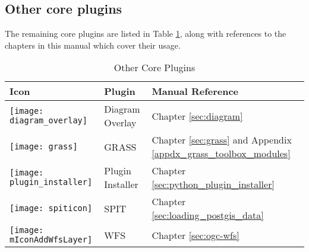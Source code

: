 
\subsection{Other core plugins}


The remaining core plugins are listed in Table \ref{tab:other_core}, along with references to 
the chapters in this manual which cover their usage.

\begin{table}[H]
\centering
\caption{Other Core Plugins}\label{tab:other_core}\medskip
\small
 \begin{tabular}{|l|l|p{4in}|}
\hline \textbf{Icon} & \textbf{Plugin} & \textbf{Manual Reference}\\
\hline
\texttt{[image: diagram\_overlay]}
 & Diagram Overlay \index{plugins!diagram}& Chapter \ref{sec:diagram}\\
\hline
\texttt{[image: grass]}
 & GRASS \index{plugin!grass toolbox} & Chapter \ref{sec:grass} and Appendix \ref{appdx_grass_toolbox_modules}\\
 \hline
\texttt{[image: plugin\_installer]}
 & Plugin Installer \index{plugins!Plugin Installer} & Chapter \ref{sec:python_plugin_installer}\\
\hline
\texttt{[image: spiticon]}
 & SPIT \index{plugins!spit}& Chapter \ref{sec:loading_postgis_data} \\
 \hline
\texttt{[image: mIconAddWfsLayer]}
 & WFS & Chapter \ref{sec:ogc-wfs} \\
\hline
\end{tabular}
\end{table}
